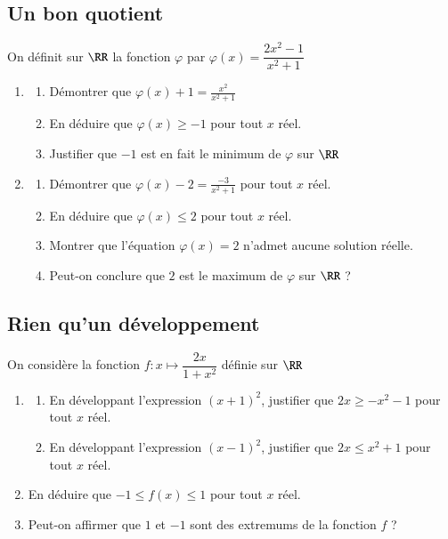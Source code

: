 \documentclass[oneside,12pt]{article}          %
\begin{document}
\subsection{Un bon quotient}
On définit sur $\RR$ la fonction $\varphi$ par $\varphi(x)=\dfrac{2x^2-1}{x^2+1}$
\begin{enumerate}
	 \item \begin{enumerate}
	 	\item Démontrer que $\varphi(x)+1=\frac{x^2}{x^2+1}$
	 	\item En déduire que $\varphi(x)\geq-1$ \quad pour tout $x$ réel.
	 	\item Justifier que $-1$ est en fait le minimum de $\varphi$ sur $\RR$
	\end{enumerate}
	\item \begin{enumerate}
		\item Démontrer que $\varphi(x)-2=\frac{-3}{x^2+1}$ \quad pour tout $x$ réel.
		\item En déduire que $\varphi(x)\leq 2$ \quad pour tout $x$ réel.
		\item Montrer que l'équation $\varphi(x)=2$ n'admet aucune solution réelle.
		\item Peut-on conclure que $2$ est le maximum de $\varphi$ sur $\RR$ ?
	\end{enumerate}
\end{enumerate}



\subsection{Rien qu'un développement}
On considère la fonction $f:x\mapsto\dfrac{2x}{1+x^2}$ définie sur $\RR$
\begin{enumerate}
	\item \begin{enumerate}
		\item En développant l'expression $(x+1)^2$, justifier que $2x\geq-x^2-1$ \quad pour tout $x$ réel.
		\item En développant l'expression $(x-1)^2$, justifier que $2x \leq x^2+1$ \quad pour tout $x$ réel.
	\end{enumerate}
	\item En déduire que $-1\leq f(x) \leq 1$ \quad pour tout $x$ réel.
	\item Peut-on affirmer que $1$  et $-1$ sont des extremums de la fonction $f$ ?
\end{enumerate}
\end{document}
